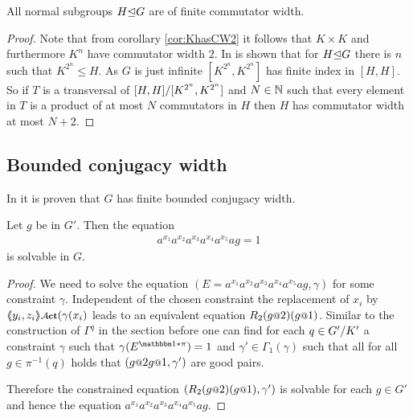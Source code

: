 \documentclass[a4paper,11pt]{amsart}
\begin{document}
\begin{cor}
 All normal subgroups $H{\mathrel\trianglelefteq} G$ are of finite commutator width.
\end{cor}
\begin{proof}
 Note that from corollary \ref{cor:KhasCW2} it follows that $K\times K$ and furthermore $K^n$ have commutator width $2$. 
 In %
 is shown that for $H{\mathrel\trianglelefteq} G$ there is $n$ such that $K^{2^n}\leq H$. As $G$ is just infinite $[K^{2^n},K^{2^n}]$ has finite index in $[H,H]$.
 So if $T$ is a transversal of ${[H,H]/[K^{2^n},K^{2^n}]}$ and $N\in \mathbb{N}$ such that every element in $T$ is a product of at most $N$ commutators
 in $H$ then $H$ has commutator width at most $N+2$.
\end{proof}
\subsection{Bounded conjugacy width}
In \cite{Fink:Conjugacy_growth} it is proven that $G$ has finite bounded conjugacy width. 
\begin{pro}
 Let $g$ be in $G'$. Then the equation 
 \begin{align*}
  a^{x_1}a^{x_2}a^{x_3}a^{x_4}a^{x_5}ag=1
 \end{align*}
is solvable in $G$. 
\end{pro}
\begin{proof}
We need to solve the equation $(E=a^{x_1}a^{x_2}a^{x_3}a^{x_4}a^{x_5}ag,\gamma)$ for
some constraint $\gamma$. Independent of the chosen constraint the replacement of
$x_i$ by $\pair{y_i,z_i}\act(\gamma(x_i)$ leads to an equivalent equation 
$R_2(g\at{2})(g\at{1})$. Similar to the construction of $\Gamma^q$ in the section
before one can find for each $q\in{G'/K'}$ a constraint $\gamma$ such that
$\gamma(E^{\id*\pi})=1$ and $\gamma'\in\Gamma_1(\gamma)$ such that all for all 
$g\in\pi^{-1}(q)$ holds that $(g\at{2}g\at{1},\gamma')$ are good pairs.

Therefore the constrained equation $(R_2(g\at{2})(g\at{1}),\gamma')$ is solvable
for each $g\in G'$ and hence the equation $a^{x_1}a^{x_2}a^{x_3}a^{x_4}a^{x_5}ag$.
 
\end{proof}
\end{document}
